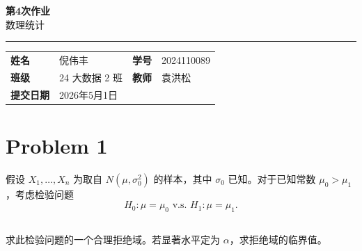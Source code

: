 \documentclass[12pt,a4paper]{article}
\newcommand{\course}{数理统计}
\newcommand{\homeworktitle}{第4次作业}
\newcommand{\studentname}{倪伟丰}
\newcommand{\studentid}{2024110089}
\newcommand{\classname}{24 大数据 2 班}
\newcommand{\teacher}{袁洪松}
\newcommand{\duedate}{2026年5月1日}
\begin{document}
\begin{center}
  {\Huge\bfseries\color{mainblue}\homeworktitle}\\[0.6em]
  {\Large\course}\\[1.2em]
  {\color{linegray}\rule{0.9\textwidth}{0.8pt}}
\end{center}

\begin{infobox}
\begin{tabularx}{\textwidth}{>{\bfseries}p{2.2cm} X >{\bfseries}p{2.2cm} X}
姓名 & \studentname & 学号 & \studentid \\
班级 & \classname & 教师 & \teacher \\
提交日期 & \duedate &  &  \\
\end{tabularx}
\end{infobox}

\section{Problem 1}

假设 $X_1,\ldots,X_n$ 为取自 $N(\mu,\sigma_0^2)$ 的样本，其中 $\sigma_0$ 已知。对于已知常数 $\mu_0 > \mu_1$，考虑检验问题
\[
H_0: \mu = \mu_0 \,\,\text{v.s.}\,\, H_1: \mu = \mu_1.
\]
\subsection{}

求此检验问题的一个合理拒绝域。若显著水平定为 $\alpha$，求拒绝域的临界值。
\end{document}
